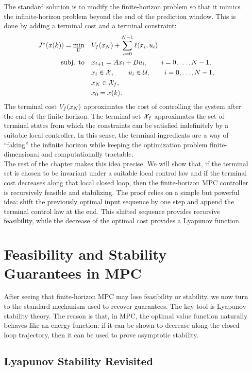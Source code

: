 The standard solution is to modify the finite-horizon problem so that it mimics the infinite-horizon
problem beyond the end of the prediction window. This is done by adding a terminal cost and a
terminal constraint:
\[
\begin{aligned}
    J^\star(x(k))
    =
    \min_U \quad
    & V_f(x_N)
    +
    \sum_{i=0}^{N-1}\ell(x_i,u_i) \\
    \text{subj. to} \quad
    & x_{i+1}=Ax_i+Bu_i,
    \qquad i=0,\ldots,N-1,\\
    & x_i\in\mathcal{X},
    \qquad
    u_i\in\mathcal{U},
    \qquad i=0,\ldots,N-1,\\
    & x_N\in\mathcal{X}_f,\\
    & x_0=x(k).
\end{aligned}
\]
The terminal cost \(V_f(x_N)\) approximates the cost of controlling the system after
the end of the finite horizon. The terminal set \(\mathcal{X}_f\) approximates the set of terminal states
from which the constraints can be satisfied indefinitely by a suitable local controller. In this
sense, the terminal ingredients are a way of ``faking'' the infinite horizon while keeping the
optimization problem finite-dimensional and computationally tractable.\\
The rest of the chapter makes this idea precise. We will show that, if the terminal set is chosen
to be invariant under a suitable local control law and if the terminal cost decreases along that
local closed loop, then the finite-horizon MPC controller is recursively feasible and stabilizing.
The proof relies on a simple but powerful idea: shift the previously optimal input sequence by
one step and append the terminal control law at the end. This shifted sequence provides
recursive feasibility, while the decrease of the optimal cost provides a Lyapunov function.

\section{Feasibility and Stability Guarantees in MPC}

After seeing that finite-horizon MPC may lose feasibility or stability, we now turn to the
standard mechanism used to recover guarantees. The key tool is Lyapunov stability theory.
The reason is that, in MPC, the optimal value function naturally behaves like an energy
function: if it can be shown to decrease along the closed-loop trajectory, then it can be used
to prove asymptotic stability.

\subsection{Lyapunov Stability Revisited}

